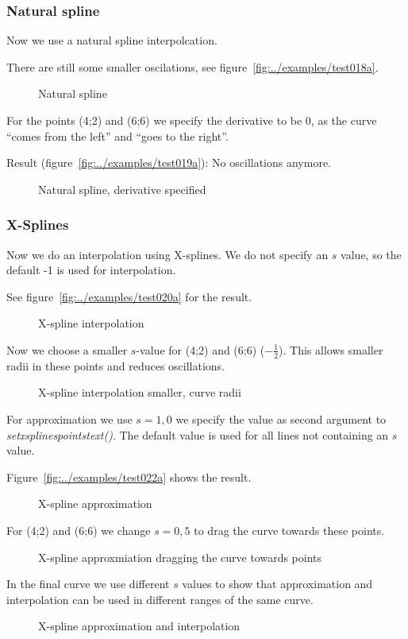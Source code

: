 \documentclass[origlongtable]{scrartcl}
\newcommand{\includepgfimage}[2]{%
\begin{figure}%
{\centering%
\caption{#2}\label{fig:#1}%
}%
\end{figure}%
}
\begin{document}
\subsubsection{Natural spline}
Now we use a natural spline interpolcation.


There are still some smaller oscilations, see figure~\vref{fig:../examples/test018a}.
\clearpage
\includepgfimage{../examples/test018a}{Natural spline}
\clearpage
For the points (4;2) and (6;6) we specify the derivative to be 0,
as the curve ``comes from the left'' and ``goes to the right''.

Result (figure~\vref{fig:../examples/test019a}): No oscillations anymore.
\clearpage
\includepgfimage{../examples/test019a}{Natural spline, derivative specified}
\clearpage
\subsubsection{X-Splines}
Now we do an interpolation using X-splines. We do not specify an
\(s\) value, so the default -1 is used for interpolation.

See figure~\vref{fig:../examples/test020a} for the result.
\clearpage
\includepgfimage{../examples/test020a}{X-spline interpolation}
\clearpage
Now we choose a smaller \(s\)-value for (4;2) and (6;6)
(\(-\tfrac{1}{2}\)). This allows smaller radii in these points
and reduces oscillations.

\includepgfimage{../examples/test021a}{X-spline interpolation smaller, curve radii}
\clearpage
For approximation we use
\(s=1,0\) we specify the value as second argument to
\textit{set\textunderscore{}xsplines\textunderscore{}points\textunderscore{}text()\/}.
The default value is used for all lines not containing an \(s\) value.

Figure~\vref{fig:../examples/test022a} shows the result.
\clearpage
\includepgfimage{../examples/test022a}{X-spline approximation}
\clearpage
For (4;2) and (6;6) we change \(s=0,5\) to drag the curve towards these points.

\clearpage
\includepgfimage{../examples/test023a}{X-spline approxmiation dragging the curve towards points}
\clearpage
In the final curve we use different \(s\) values to show that approximation
and interpolation can be used in different ranges of the same curve.

\clearpage
\includepgfimage{../examples/test024a}{X-spline approximation and interpolation}
\clearpage
\end{document}
